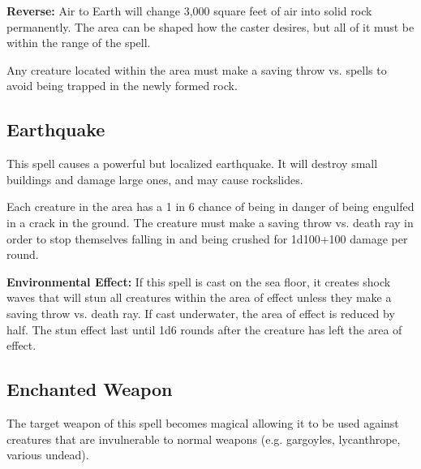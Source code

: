 \begin{multicols*}{2}
\textbf{Reverse:} \hypertarget{spell:Air to Earth}{Air to Earth} will change 3,000 square feet of air into solid rock permanently. The area can be shaped how the caster desires, but all of it must be within the range of the spell.

Any creature located within the area must make a saving throw vs. spells to avoid being trapped in the newly formed rock.

\subsection{Earthquake}\label{spell:Earthquake}

This spell causes a powerful but localized earthquake. It will destroy small buildings and damage large ones, and may cause rockslides.

Each creature in the area has a 1 in 6 chance of being in danger of being engulfed in a crack in the ground. The creature must make a saving throw vs. death ray in order to stop themselves falling in and being crushed for 1d100+100 damage per round.

\textbf{Environmental Effect:} If this spell is cast on the sea floor, it creates shock waves that will stun all creatures within the area of effect unless they make a saving throw vs. death ray. If cast underwater, the area of effect is reduced by half. The stun effect last until 1d6 rounds after the creature has left the area of effect.

\subsection{Enchanted Weapon}\label{spell:Enchanted Weapon}

The target weapon of this spell becomes magical allowing it to be used against creatures that are invulnerable to normal weapons (e.g. gargoyles, lycanthrope, various undead).


\end{multicols*}
